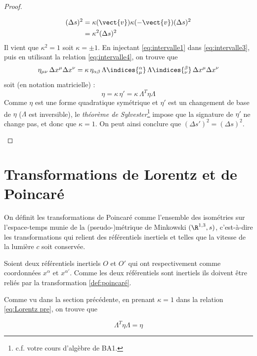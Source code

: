 {\begin{proof}
\begin{enumerate}
        \begin{align}
            (\Delta s)^2 &= \kappa(\vect{v}) \kappa(-\vect{v}) (\Delta s)^2\\
            &= \kappa^2(\Delta s)^2
        \end{align}
        Il vient que $\kappa ^2= 1$ soit $\kappa = \pm 1$. En injectant \ref{eq:intervalle1} dans \ref{eq:intervalle3}, puis en utilisant la relation \ref{eq:intervalle4}, on trouve que
        \begin{equation}
            \eta_{\mu\nu} \, \Delta x^\mu \Delta x^\nu = \kappa \, \eta_{\alpha\beta} \, \Lambda\indices{^\alpha_{\mu}} \, \Lambda\indices{^\beta_{\nu}}\, \Delta x^\mu \Delta x^\nu
        \end{equation}
        soit (en notation matricielle) :
        \begin{equation}
            \label{eq:Lorentz pre}
            \eta = \kappa \,\eta'=\kappa \,\Lambda^T\eta \Lambda
        \end{equation}
        Comme $\eta$ est une forme quadratique symétrique et $\eta'$ est un changement de base de $\eta$ ($\Lambda$ est inversible), le \textit{théorème de Sylvester}\footnote{c.f. votre cours d'algèbre de BA1.} impose que la signature de $\eta'$ ne change pas, et donc que $\kappa=1$. On peut ainsi conclure que $(\Delta s')^2 = (\Delta s)^2$.
    \end{enumerate}
\end{proof}

\section{Transformations de Lorentz et de Poincaré}

On définit les transformations de Poincaré comme l'ensemble des isométries sur l'espace-temps munie de la (pseudo-)métrique de Minkowski $(\R^{1,3},s)$, c'est-à-dire les transformations qui relient des référentiels inertiels et telles que la vitesse de la lumière $c$ soit conservée.

Soient deux référentiels inertiels $O$ et $O'$ qui ont respectivement comme coordonnées $x^{\alpha}$ et $x^{\alpha '}$. 
Comme les deux référentiels sont inertiels ils doivent être reliés par la transformation \ref{def:poincaré}. 

Comme vu dans la section précédente, en prenant $\kappa = 1$ dans la relation \ref{eq:Lorentz pre}, on trouve que

\begin{equation}
    \label{eq:Lorentz}
    \boxed{\Lambda ^{T} \eta \Lambda = \eta}
\end{equation}

}
